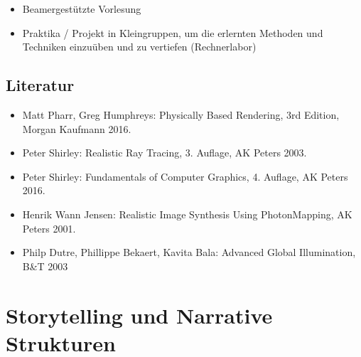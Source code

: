 \begin{itemize}
\tightlist
\item
  Beamergestützte Vorlesung
\item
  Praktika / Projekt in Kleingruppen, um die erlernten Methoden und
  Techniken einzuüben und zu vertiefen (Rechnerlabor)
\end{itemize}

\section*{Literatur\label{/mi-2017/modulbeschreibungen-master/MA_VC_Modul_PhotorealistischeBildsynthese}}\label{literaturpathlabelmi-2017modulbeschreibungen-mastermaux5fvcux5fmodulux5fphotorealistischebildsynthese}

\begin{itemize}
\tightlist
\item
  Matt Pharr, Greg Humphreys: Physically Based Rendering, 3rd Edition,
  Morgan Kaufmann 2016.
\item
  Peter Shirley: Realistic Ray Tracing, 3. Auflage, AK Peters 2003.
\item
  Peter Shirley: Fundamentals of Computer Graphics, 4. Auflage, AK
  Peters 2016.
\item
  Henrik Wann Jensen: Realistic Image Synthesis Using PhotonMapping, AK
  Peters 2001.
\item
  Philp Dutre, Phillippe Bekaert, Kavita Bala: Advanced Global
  Illumination, B\&T 2003
\end{itemize}

\chapter{Storytelling und Narrative
Strukturen\label{/mi-2017/modulbeschreibungen-master/MA_VC_Modul_Storytelling}}\label{storytelling-und-narrative-strukturenpathlabelmi-2017modulbeschreibungen-mastermaux5fvcux5fmodulux5fstorytelling}

